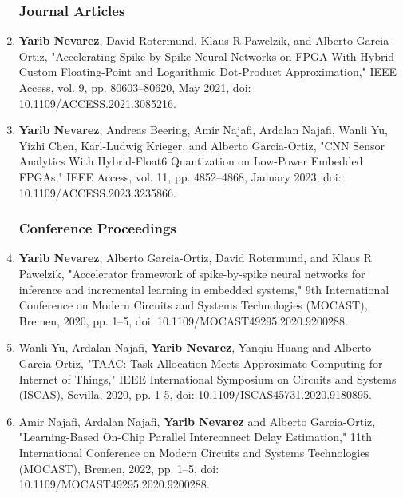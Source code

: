 \begin{enumerate}
	
	\subsubsection*{Journal Articles}
	
	\item \textbf{Yarib Nevarez}, David Rotermund, Klaus R Pawelzik, and Alberto Garcia-Ortiz, "Accelerating Spike-by-Spike Neural Networks on FPGA With Hybrid Custom Floating-Point and Logarithmic Dot-Product Approximation," 
	\newblock IEEE Access, vol. 9, pp. 80603--80620, May 2021, doi: 10.1109/ACCESS.2021.3085216.  
	
	\item \textbf{Yarib Nevarez}, Andreas Beering, Amir Najafi, Ardalan Najafi, Wanli Yu, Yizhi Chen, Karl-Ludwig Krieger, and Alberto Garcia-Ortiz, "CNN Sensor Analytics With Hybrid-Float6 Quantization on Low-Power Embedded FPGAs," 
	\newblock IEEE Access, vol. 11, pp. 4852--4868, January 2023, doi: 10.1109/ACCESS.2023.3235866.

	
	\subsubsection*{Conference Proceedings}
	
	\item \textbf{Yarib Nevarez}, Alberto Garcia-Ortiz, David Rotermund, and Klaus R Pawelzik, "Accelerator framework of spike-by-spike neural networks for inference and incremental learning in embedded systems,"
	 9th International Conference on Modern Circuits and Systems Technologies (MOCAST), Bremen, 2020, pp. 1--5, doi: 10.1109/MOCAST49295.2020.9200288.
	
	\item Wanli Yu, Ardalan Najafi, \textbf{Yarib Nevarez}, Yanqiu Huang and Alberto Garcia-Ortiz, "TAAC: Task Allocation Meets Approximate Computing for Internet of Things," 
	 IEEE International Symposium on Circuits and Systems (ISCAS), Sevilla, 2020, pp. 1-5, doi: 10.1109/ISCAS45731.2020.9180895.
	
	\item Amir Najafi, Ardalan Najafi, \textbf{Yarib Nevarez} and Alberto Garcia-Ortiz, "Learning-Based On-Chip Parallel Interconnect Delay Estimation," 
	 11th International Conference on Modern Circuits and Systems Technologies (MOCAST), Bremen, 2022, pp. 1--5, doi: 10.1109/MOCAST49295.2020.9200288.
	

\end{enumerate}

